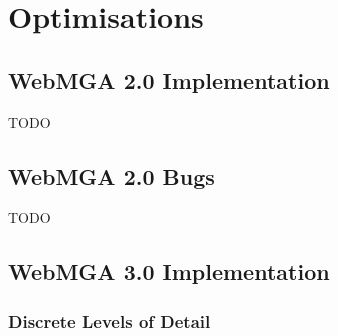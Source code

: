 \section{Optimisations}
\subsection{WebMGA 2.0 Implementation}
TODO

\subsection{WebMGA 2.0 Bugs}
TODO

\subsection{WebMGA 3.0 Implementation}
\subsubsection{Discrete Levels of Detail}
